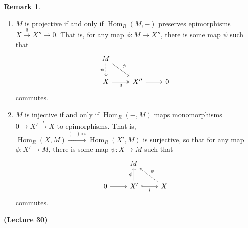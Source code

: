 \documentclass[10pt,letterpaper,cm]{nupset}
\theoremstyle{definition}
\newtheorem{remark}{Remark}
\newcommand{\1}{\mathbf{1}}
\newcommand{\0}{\vec 0}
\DeclareMathOperator{\Hom}{Hom}
\begin{document}
\begin{remark} $ $
\begin{enumerate}
\item $M$ is projective  if and only if $\Hom_R(M, -)$ preserves epimorphisms $X \overset{q}{\longrightarrow}  X'' \to 0$. That is, for any map $\phi : M \to X''$, there is some map $\psi$ such that
\[
\begin{tikzcd}
M \arrow[rd, "\phi"] \arrow[d, "\psi"', dashed] &  &  \\
X \arrow[r, "q"', two heads] & X'' \arrow[r] & 0
\end{tikzcd}
\] commutes.
\item $M$ is injective  if and only if $\Hom_R(-, M)$ maps monomorphisms $0\to X' \overset{i}{\longrightarrow} X$ to epimorphisms. That is, $\Hom_R(X, M) \overset{(-) \circ i}{\longrightarrow} \Hom_R(X', M)$ is surjective, so that for any map $\phi : X' \to M$, there is some map $\psi : X \to M$ such that 
\[
\begin{tikzcd}
 & M &  \\
0 \arrow[r] & X' \arrow[r, "i"', hook] \arrow[u, "\phi"] & X \arrow[lu, "\psi"', dashed]
\end{tikzcd}
\] commutes.
\end{enumerate}
\end{remark}

\begin{center}
{\textbf{(Lecture 30)}}
\end{center}
\end{document}
